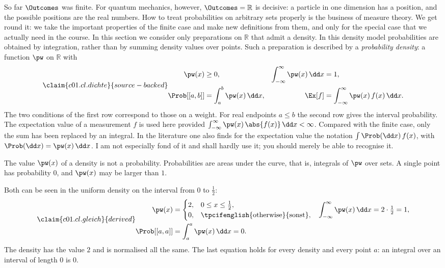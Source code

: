So far $\Outcomes$ was finite. For quantum mechanics, however,
$\Outcomes = \mathbb{R}$ is decisive: a particle in one dimension has a position,
and the possible positions are the real numbers. How to treat probabilities on arbitrary
sets properly is the business of measure theory. We get round it: we take the important
properties of the finite case and make new definitions from them, and only for the special
case that we actually need in the course. In this section we consider only
preparations on $\mathbb{R}$ that admit a density. In this density model probabilities
are obtained by integration, rather than by summing density values over points.
Such a preparation is described by a \emph{probability density}: a function $\pw$ on
$\mathbb{R}$ with
\begin{equation}\label{c01.eq.dichte}\claim{c01.cl.dichte}{source-backed}
  \begin{aligned}
    \pw(x) &\geq 0,
    &\int_{-\infty}^{\infty} \pw(x)\,\dd x &= 1, \\
    \Prob[[a,b]] &= \int_a^b \pw(x)\,\dd x,
    &\Ex[f] &= \int_{-\infty}^{\infty} \pw(x)\, f(x)\,\dd x .
  \end{aligned}
\end{equation}
The two conditions of the first row correspond to those on a weight. For real endpoints
$a \leq b$ the second row gives the interval probability. The expectation value of a
measurement $f$ is used here provided
$\int_{-\infty}^{\infty} \pw(x)\,\abs{f(x)}\,\dd x < \infty$. Compared with the finite
case, only the sum has been replaced by an integral. In the literature one also finds for the
expectation value the notation $\int \Prob(\dd x)\, f(x)$, with
$\Prob(\dd x) = \pw(x)\,\dd x$. I am not especially fond of it and shall hardly use it;
you should merely be able to recognise it.

\begin{merksatz}
  The value $\pw(x)$ of a density is not a probability. Probabilities are
  areas under the curve, that is, integrals of $\pw$ over sets. A single point has
  probability $0$, and $\pw(x)$ may be larger than $1$.
\end{merksatz}

Both can be seen in the uniform density on the interval from $0$ to $\tfrac12$:
\begin{equation}\label{c01.eq.gleich}\claim{c01.cl.gleich}{derived}
  \begin{aligned}
    \pw(x) &=
    \begin{cases}
      2, & 0 \leq x \leq \tfrac12, \\
      0, & \text{\tpcifenglish{otherwise}{sonst}},
    \end{cases}
    &\int_{-\infty}^{\infty} \pw(x)\,\dd x &= 2\cdot\tfrac12 = 1, \\
    \Prob[[a,a]] &= \int_a^a \pw(x)\,\dd x = 0 .
  \end{aligned}
\end{equation}
The density has the value $2$ and is normalised all the same. The last equation holds for
every density and every point $a$: an integral over an interval of length $0$ is $0$.

